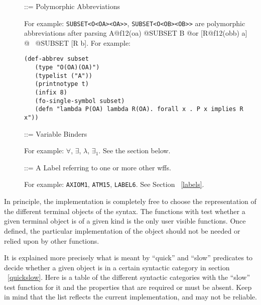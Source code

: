 \begin{description}
\item [ ] ::= Polymorphic Abbreviations

 For example: {\tt SUBSET<O<OA><OA>>}, {\tt SUBSET<O<OB><OB>>} are polymorphic
abbreviations after parsing {\wt A@f12(oa) @SUBSET B @or [R@f12(obb) a] @~
@SUBSET [R b]}. For example:
\begin{verbatim}
(def-abbrev subset
   (type "O(OA)(OA)")
   (typelist ("A"))
   (printnotype t)
   (infix 8)
   (fo-single-symbol subset)
   (defn "lambda P(OA) lambda R(OA). forall x . P x implies R x"))
\end{verbatim}

\item [ ] ::=  Variable Binders

For example: $\forall$, $\exists$, $\lambda$, $\exists_1$. See the section below.

\item [ ] ::= A Label referring to one or more other wffs.

 For example: {\tt AXIOM1}, {\tt ATM15}, {\tt LABEL6}.  See Section ~\ref{labels}.
\end{description}

In principle, the implementation is completely free to choose the
representation of the different terminal objects of the syntax.
The functions with test whether a given terminal object is of a given
kind is the only user visible functions.  Once defined, the particular
implementation of the object should not be needed or relied upon
by other functions.

It is explained more precisely what is meant by ``quick'' and ``slow''
predicates to decide whether a given object is in a certain syntactic
category in section ~\ref{quickslow}.  Here is a table of the different
syntactic categories with the ``slow'' test function for it and
the properties that are required or must be absent.
Keep in mind that the list reflects the current implementation, and
may not be reliable.

